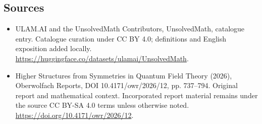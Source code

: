 \documentclass[11pt]{article}
\begin{document}
\subsection{Sources}
\begin{itemize}
\item[\hypertarget{source:statement:1}{S1}] ULAM.AI and the UnsolvedMath Contributors, UnsolvedMath, catalogue entry. Catalogue curation under CC BY 4.0; definitions and English exposition added locally.
\url{https://huggingface.co/datasets/ulamai/UnsolvedMath}.
\item[\hypertarget{source:statement:2}{S2}] Higher Structures from Symmetries in Quantum Field Theory (2026), Oberwolfach Reports, DOI 10.4171/owr/2026/12, pp. 737--794. Original report and mathematical context. Incorporated report material remains under the source CC BY-SA 4.0 terms unless otherwise noted.
\url{https://doi.org/10.4171/owr/2026/12}.
\end{itemize}
\label{end:statement}
\end{document}

